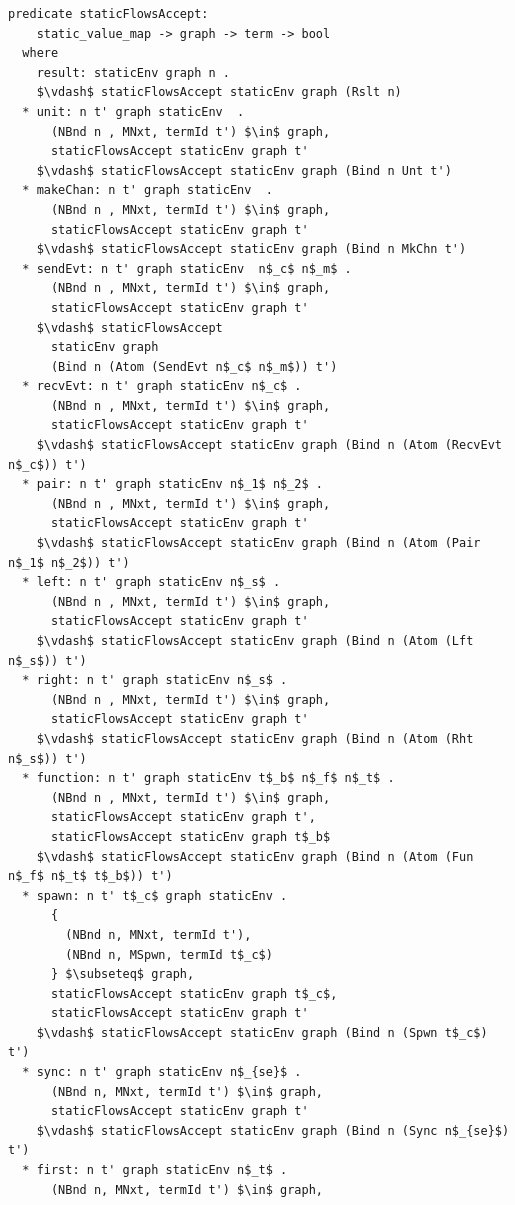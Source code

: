 \documentclass[letterpaper, 11pt]{extarticle}
\begin{document}
\begin{lstlisting}[language=logic, mathescape]
  predicate staticFlowsAccept:
    static_value_map -> graph -> term -> bool
  where
    result: staticEnv graph n .
    $\vdash$ staticFlowsAccept staticEnv graph (Rslt n)
  * unit: n t' graph staticEnv  .
      (NBnd n , MNxt, termId t') $\in$ graph,
      staticFlowsAccept staticEnv graph t'
    $\vdash$ staticFlowsAccept staticEnv graph (Bind n Unt t')
  * makeChan: n t' graph staticEnv  .
      (NBnd n , MNxt, termId t') $\in$ graph,
      staticFlowsAccept staticEnv graph t'
    $\vdash$ staticFlowsAccept staticEnv graph (Bind n MkChn t')
  * sendEvt: n t' graph staticEnv  n$_c$ n$_m$ .
      (NBnd n , MNxt, termId t') $\in$ graph, 
      staticFlowsAccept staticEnv graph t'
    $\vdash$ staticFlowsAccept
      staticEnv graph
      (Bind n (Atom (SendEvt n$_c$ n$_m$)) t')
  * recvEvt: n t' graph staticEnv n$_c$ .
      (NBnd n , MNxt, termId t') $\in$ graph,
      staticFlowsAccept staticEnv graph t'
    $\vdash$ staticFlowsAccept staticEnv graph (Bind n (Atom (RecvEvt n$_c$)) t')
  * pair: n t' graph staticEnv n$_1$ n$_2$ .
      (NBnd n , MNxt, termId t') $\in$ graph,
      staticFlowsAccept staticEnv graph t'
    $\vdash$ staticFlowsAccept staticEnv graph (Bind n (Atom (Pair n$_1$ n$_2$)) t')
  * left: n t' graph staticEnv n$_s$ .
      (NBnd n , MNxt, termId t') $\in$ graph,
      staticFlowsAccept staticEnv graph t'
    $\vdash$ staticFlowsAccept staticEnv graph (Bind n (Atom (Lft n$_s$)) t')
  * right: n t' graph staticEnv n$_s$ .
      (NBnd n , MNxt, termId t') $\in$ graph,
      staticFlowsAccept staticEnv graph t'
    $\vdash$ staticFlowsAccept staticEnv graph (Bind n (Atom (Rht n$_s$)) t')
  * function: n t' graph staticEnv t$_b$ n$_f$ n$_t$ .
      (NBnd n , MNxt, termId t') $\in$ graph,
      staticFlowsAccept staticEnv graph t', 
      staticFlowsAccept staticEnv graph t$_b$
    $\vdash$ staticFlowsAccept staticEnv graph (Bind n (Atom (Fun n$_f$ n$_t$ t$_b$)) t')
  * spawn: n t' t$_c$ graph staticEnv .
      {
        (NBnd n, MNxt, termId t'),
        (NBnd n, MSpwn, termId t$_c$)
      } $\subseteq$ graph, 
      staticFlowsAccept staticEnv graph t$_c$, 
      staticFlowsAccept staticEnv graph t'
    $\vdash$ staticFlowsAccept staticEnv graph (Bind n (Spwn t$_c$) t')
  * sync: n t' graph staticEnv n$_{se}$ .
      (NBnd n, MNxt, termId t') $\in$ graph, 
      staticFlowsAccept staticEnv graph t'
    $\vdash$ staticFlowsAccept staticEnv graph (Bind n (Sync n$_{se}$) t')
  * first: n t' graph staticEnv n$_t$ .
      (NBnd n, MNxt, termId t') $\in$ graph, 

\end{lstlisting}
\end{document}

